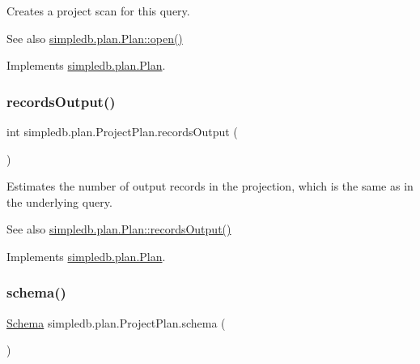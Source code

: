 Creates a project scan for this query. \begin{DoxySeeAlso}{See also}
\hyperlink{interfacesimpledb_1_1plan_1_1Plan_aaa4c15cda4e9c0d52308850f9f13ff99}{simpledb.\+plan.\+Plan\+::open()} 
\end{DoxySeeAlso}


Implements \hyperlink{interfacesimpledb_1_1plan_1_1Plan_aaa4c15cda4e9c0d52308850f9f13ff99}{simpledb.\+plan.\+Plan}.

\mbox{\label{classsimpledb_1_1plan_1_1ProjectPlan_ae62939db691f1180bb17101d48d08f82}} 
\subsubsection{\texorpdfstring{records\+Output()}{recordsOutput()}}
{\footnotesize\ttfamily int simpledb.\+plan.\+Project\+Plan.\+records\+Output (\begin{DoxyParamCaption}{ }\end{DoxyParamCaption})\hspace{0.3cm}{\ttfamily [inline]}}

Estimates the number of output records in the projection, which is the same as in the underlying query. \begin{DoxySeeAlso}{See also}
\hyperlink{interfacesimpledb_1_1plan_1_1Plan_a187e06657d356c80a7f743d7ff8fd257}{simpledb.\+plan.\+Plan\+::records\+Output()} 
\end{DoxySeeAlso}


Implements \hyperlink{interfacesimpledb_1_1plan_1_1Plan_a187e06657d356c80a7f743d7ff8fd257}{simpledb.\+plan.\+Plan}.

\mbox{\label{classsimpledb_1_1plan_1_1ProjectPlan_a748d16b8055b9b3769e6f0713f1da18f}} 
\subsubsection{\texorpdfstring{schema()}{schema()}}
{\footnotesize\ttfamily \hyperlink{classsimpledb_1_1record_1_1Schema}{Schema} simpledb.\+plan.\+Project\+Plan.\+schema (\begin{DoxyParamCaption}{ }\end{DoxyParamCaption})\hspace{0.3cm}{\ttfamily [inline]}}


